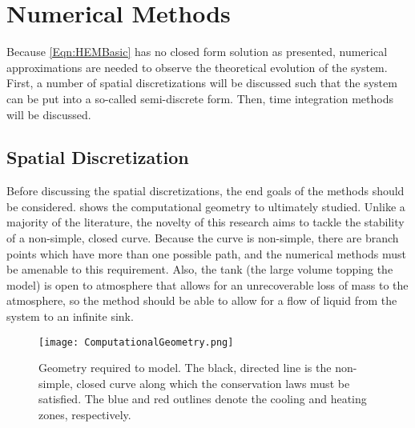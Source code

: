 \section{Numerical Methods}\label{Section:Numerics}
Because \cref{Eqn:HEMBasic} has no closed form solution as presented, numerical approximations are needed to observe the theoretical evolution of the system.
First, a number of spatial discretizations will be discussed such that the system can be put into a so-called semi-discrete form.
Then, time integration methods will be discussed.

\subsection{Spatial Discretization}\label{Subsection:SpatialDiscretization}
Before discussing the spatial discretizations, the end goals of the methods should be considered.
 shows the computational geometry to ultimately studied.
Unlike a  majority of the literature, the novelty of this research aims to tackle the stability of a non-simple, closed curve.
Because the curve is non-simple, there are branch points which have more than one possible path, and the numerical methods must be amenable to this requirement.
Also, the tank (the large volume topping the model) is open to atmosphere that allows for an unrecoverable loss of mass to the atmosphere, so the method should be able to allow for a flow of liquid from the system to an infinite sink.

\begin{figure}%
    \centering
    \caption[Geomtry to model]{Geometry required to model.  
                The black, directed line is the non-simple, closed curve along which the conservation laws must be satisfied.
                 The blue and red outlines denote the cooling and heating zones, respectively.}%
    \label{Figure:ComputationGeometry}%
    \texttt{[image: ComputationalGeometry.png]}%
\end{figure}


